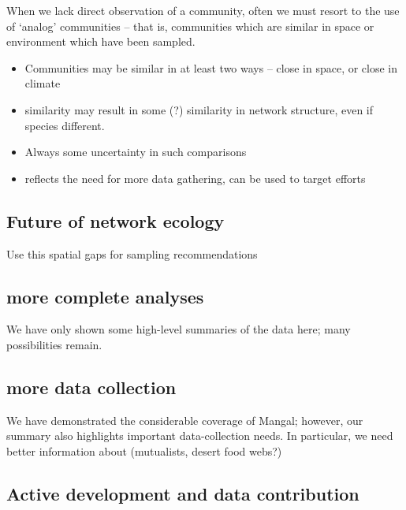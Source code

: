 When we lack direct observation of a community, often we must resort to
the use of `analog' communities -- that is, communities which are
similar in space or environment which have been sampled.

\begin{itemize}
\tightlist
\item
  Communities may be similar in at least two ways -- close in space, or
  close in climate
\item
  similarity may result in some (?) similarity in network structure,
  even if species different.
\item
  Always some uncertainty in such comparisons
\item
  reflects the need for more data gathering, can be used to target
  efforts
\end{itemize}

\hypertarget{future-of-network-ecology}{%
\subsection{Future of network ecology}\label{future-of-network-ecology}}

Use this spatial gaps for sampling recommendations

\hypertarget{more-complete-analyses}{%
\subsection{more complete analyses}\label{more-complete-analyses}}

We have only shown some high-level summaries of the data here; many
possibilities remain.

\hypertarget{more-data-collection}{%
\subsection{more data collection}\label{more-data-collection}}

We have demonstrated the considerable coverage of Mangal; however, our
summary also highlights important data-collection needs. In particular,
we need better information about (mutualists, desert food webs?)

\hypertarget{active-development-and-data-contribution}{%
\subsection{Active development and data
contribution}\label{active-development-and-data-contribution}}

